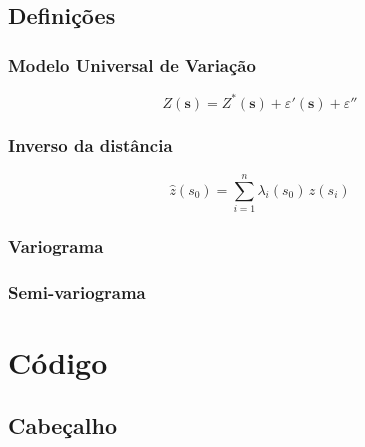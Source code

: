 \documentclass[
]{book}
\theoremstyle{definition}
\theoremstyle{definition}
\theoremstyle{definition}
\theoremstyle{definition}
\theoremstyle{remark}
\begin{document}
\hypertarget{definiuxe7uxf5es}{%
\section{Definições}\label{definiuxe7uxf5es}}

\hypertarget{modelo-universal-de-variauxe7uxe3o}{%
\subsection*{Modelo Universal de Variação}\label{modelo-universal-de-variauxe7uxe3o}}

\begin{equation}
  Z(\mathbf{s}) = Z^{*}(\mathbf{s}) + \varepsilon'(\mathbf{s}) + \varepsilon''
  \label{eq:modelo-universal}
\end{equation}

\hypertarget{inverso-da-distuxe2ncia}{%
\subsection*{Inverso da distância}\label{inverso-da-distuxe2ncia}}

\begin{equation}
  \hat{z}(s_ 0) = \sum_{i=1}^{n} \lambda_i(s_0) \, z(s_ i)
  \label{eq:inv-dist}
\end{equation}

\hypertarget{variograma}{%
\subsection*{Variograma}\label{variograma}}

\hypertarget{semi-variograma}{%
\subsection*{Semi-variograma}\label{semi-variograma}}

\hypertarget{codigo}{%
\chapter{Código}\label{codigo}}

\hypertarget{cabeuxe7alho}{%
\section{Cabeçalho}\label{cabeuxe7alho}}
\end{document}
